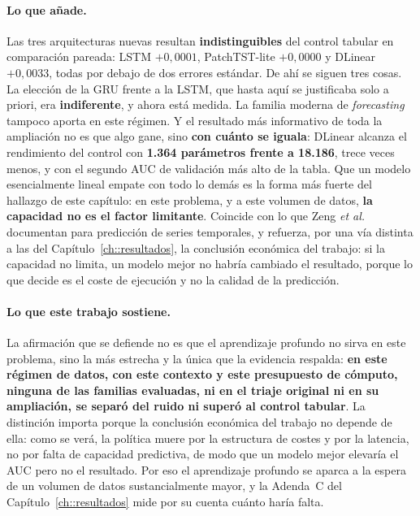 \paragraph{Lo que añade.} Las tres arquitecturas nuevas resultan \textbf{indistinguibles} del
control tabular en comparación pareada: LSTM $+0{,}0001$, PatchTST-lite $+0{,}0000$ y DLinear
$+0{,}0033$, todas por debajo de dos errores estándar. De ahí se siguen tres cosas. La
elección de la GRU frente a la LSTM, que hasta aquí se justificaba solo a priori, era
\textbf{indiferente}, y ahora está medida. La familia moderna de \emph{forecasting} tampoco
aporta en este régimen. Y el resultado más informativo de toda la ampliación no es que algo
gane, sino \textbf{con cuánto se iguala}: DLinear alcanza el rendimiento del control con
\textbf{1.364 parámetros frente a 18.186}, trece veces menos, y con el segundo AUC de
validación más alto de la tabla. Que un modelo esencialmente lineal empate con todo lo demás
es la forma más fuerte del hallazgo de este capítulo: en este problema, y a este volumen de
datos, \textbf{la capacidad no es el factor limitante}. Coincide con lo que Zeng
\emph{et al.}~\cite{zeng2023dlinear} documentan para predicción de series temporales, y
refuerza, por una vía distinta a las del Capítulo~\ref{ch::resultados}, la conclusión
económica del trabajo: si
la capacidad no limita, un modelo mejor no habría cambiado el resultado, porque lo que decide
es el coste de ejecución y no la calidad de la predicción.

\paragraph{Lo que este trabajo sostiene.} La afirmación que se defiende no es que el
aprendizaje profundo no sirva en este problema, sino la más estrecha y la única que la
evidencia respalda: \textbf{en este régimen de datos, con este contexto y este presupuesto
de cómputo, ninguna de las familias evaluadas, ni en el triaje original ni en su ampliación,
se separó del ruido ni superó al control tabular}. La distinción importa porque la
conclusión económica del trabajo no depende de ella: como se verá, la política muere por la
estructura de costes y por la latencia, no por falta de capacidad predictiva, de modo que un
modelo mejor elevaría el AUC pero no el resultado. Por eso el aprendizaje profundo se aparca
a la espera de un volumen de datos sustancialmente mayor, y la Adenda~C del
Capítulo~\ref{ch::resultados} mide por su cuenta cuánto haría falta.

